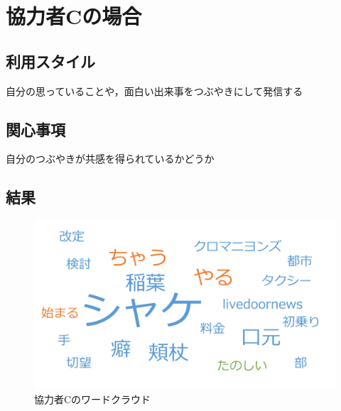 \section{協力者Cの場合}

\subsection{利用スタイル}
自分の思っていることや，面白い出来事をつぶやきにして発信する

\subsection{関心事項}
自分のつぶやきが共感を得られているかどうか

\subsection{結果}

\begin{figure}[H]
\centering
\includegraphics[width=13cm]{kawate_cloud.png}
\caption{協力者Cのワードクラウド}\label{kawatecloud}
\end{figure}

